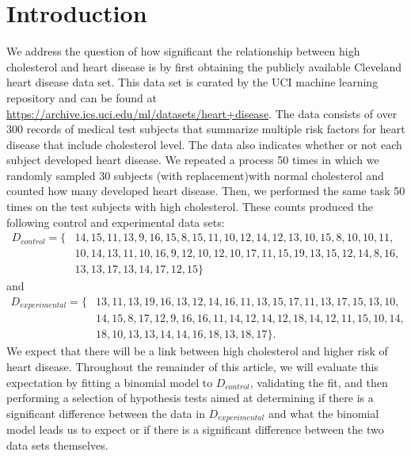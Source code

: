 \documentclass{amsart}
\begin{document}
\section{Introduction}\label{S:Introduction}
We address the question of how significant the relationship between high cholesterol and heart disease is by first obtaining the publicly available Cleveland heart disease data set. This data set is curated by the UCI machine learning repository and can be found at \url{https://archive.ics.uci.edu/ml/datasets/heart+disease}. The data consists of over 300 records of medical test subjects that summarize multiple risk factors for heart disease that include cholesterol level. The data also indicates whether or not each subject developed heart disease. We repeated a process 50 times in which we randomly sampled 30 subjects (with replacement)with normal cholesterol and counted how many developed heart disease. Then, we performed the same task 50 times on the test subjects with high cholesterol. These counts produced the following control and experimental data sets:
\begin{align*}
D_{control}=\{&14, 15, 11, 13, 9, 16, 15, 8, 15, 11, 10, 12, 14, 12, 13, 10, 15, 8, 10, 10, 11, \\
&10, 14, 13, 11, 10, 16, 9, 12, 10, 12, 10, 17, 11, 15, 19, 13, 15, 12, 14, 8, 16,\\ &13, 13, 17, 13, 14, 17, 12, 15
\}
\end{align*}
and
\begin{align*}
D_{experimental}=\{&13, 11, 13, 19, 16, 13, 12, 14, 16, 11, 13, 15, 17, 11, 13, 17, 15, 13, 10,\\
&14, 15, 8, 17, 12, 9, 16, 16, 11, 14, 12, 14, 12, 18, 14, 12, 11, 15, 10, 14,\\
&18, 10, 13, 13, 14, 14, 16, 18, 13, 18, 17
\}.
\end{align*}
We expect that there will be a link between high cholesterol and higher risk of heart disease. Throughout the remainder of this article, we will evaluate this expectation by fitting a binomial model to $D_{control}$, validating the fit, and then performing a selection of hypothesis tests aimed at determining if there is a significant difference between the data in $D_{experimental}$ and what the binomial model leads us to expect or if there is a significant difference between the two data sets themselves.
\end{document}

